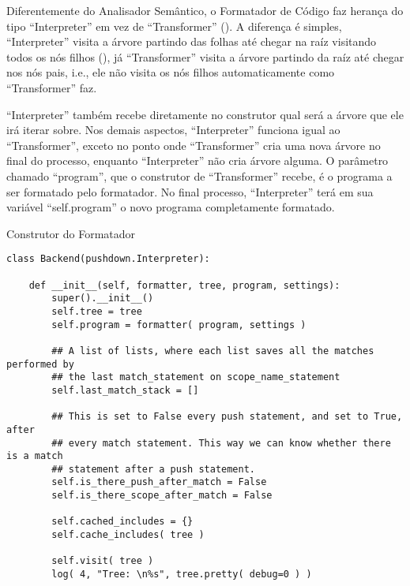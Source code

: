 Diferentemente do Analisador Semântico,
o Formatador de Código faz herança do tipo ``Interpreter'' em vez de ``Transformer'' ().
A diferença é simples,
``Interpreter'' visita a árvore partindo das folhas até chegar na raíz visitando todos os nós filhos (),
já ``Transformer'' visita a árvore partindo da raíz até chegar nos nós pais,
i.e.,
ele não visita os nós filhos automaticamente como ``Transformer'' faz.

``Interpreter'' também recebe diretamente no construtor qual será a árvore que ele irá iterar sobre.
Nos demais aspectos,
``Interpreter'' funciona igual ao ``Transformer'',
exceto no ponto onde ``Transformer'' cria uma nova árvore no final do processo,
enquanto ``Interpreter'' não cria árvore alguma.
O parâmetro chamado ``program'',
que o construtor de ``Transformer'' recebe,
é o programa a ser formatado pelo formatador.
No final processo,
``Interpreter'' terá em sua variável ``self.program'' o novo programa completamente formatado.
\begin{code}
\caption{Construtor do Formatador}
\label{construtorDoFormatador}
\begin{verbatim}
class Backend(pushdown.Interpreter):

    def __init__(self, formatter, tree, program, settings):
        super().__init__()
        self.tree = tree
        self.program = formatter( program, settings )

        ## A list of lists, where each list saves all the matches performed by
        ## the last match_statement on scope_name_statement
        self.last_match_stack = []

        ## This is set to False every push statement, and set to True, after
        ## every match statement. This way we can know whether there is a match
        ## statement after a push statement.
        self.is_there_push_after_match = False
        self.is_there_scope_after_match = False

        self.cached_includes = {}
        self.cache_includes( tree )

        self.visit( tree )
        log( 4, "Tree: \n%s", tree.pretty( debug=0 ) )
\end{verbatim}
\end{code}

